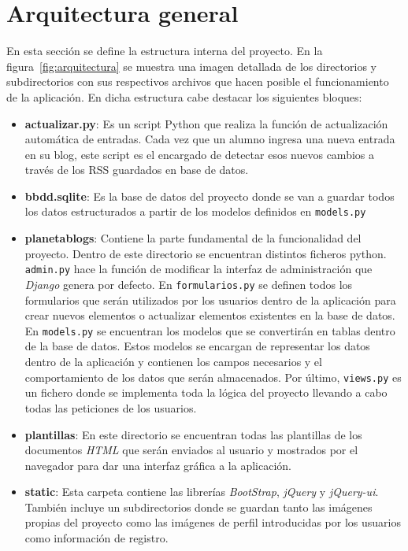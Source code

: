 \documentclass[a4paper, 12pt]{book}
\begin{document}
\section{Arquitectura general} 
\label{sec:arquitectura}
En esta secci\'on se define la estructura interna del proyecto. En la figura~\ref{fig:arquitectura} se muestra una imagen detallada de los directorios y 
subdirectorios con sus respectivos archivos que hacen posible el funcionamiento de la aplicaci\'on.
En dicha estructura cabe destacar los siguientes bloques:
\begin{itemize}
  \item {\bfseries actualizar.py}: Es un script Python que realiza la funci\'on de actualizaci\'on autom\'atica de entradas. Cada vez que un alumno ingresa
  una nueva entrada en su blog, este script es el encargado de detectar esos nuevos cambios a trav\'es de los RSS guardados en base de datos.
  \item {\bfseries bbdd.sqlite}: Es la base de datos del proyecto donde se van a guardar todos los datos estructurados a partir de los modelos definidos en 
  \texttt{models.py}
  \item {\bfseries planetablogs}: Contiene la parte fundamental de la funcionalidad del proyecto. Dentro de este directorio se encuentran distintos ficheros
  python. \texttt{admin.py} hace la funci\'on de modificar la interfaz de administraci\'on que \textit{Django} genera por defecto. En \texttt{formularios.py}
  se definen todos los formularios que ser\'an utilizados por los usuarios dentro de la aplicaci\'on para crear nuevos elementos o actualizar elementos
  existentes en la base de datos. En \texttt{models.py} se encuentran los modelos que se convertir\'an en tablas dentro de la base de datos. Estos modelos se
  encargan de representar los datos dentro de la aplicaci\'on y contienen los campos necesarios y el comportamiento de los datos que ser\'an almacenados.
  Por \'ultimo, \texttt{views.py} es un fichero donde se implementa toda la l\'ogica del proyecto llevando a cabo todas las peticiones de los usuarios.
  \item {\bfseries plantillas}: En este directorio se encuentran todas las plantillas de los documentos \textit{HTML} que ser\'an enviados al usuario y 
  mostrados por el navegador para dar una interfaz gr\'afica a la aplicaci\'on.
  \item {\bfseries static}: Esta carpeta contiene las librer\'ias \textit{BootStrap}, \textit{jQuery} y \textit{jQuery-ui}. Tambi\'en incluye un subdirectorios
  donde se guardan tanto las im\'agenes propias del proyecto como las im\'agenes de perfil introducidas por los usuarios como informaci\'on de registro. 

\end{itemize}
\end{document}

